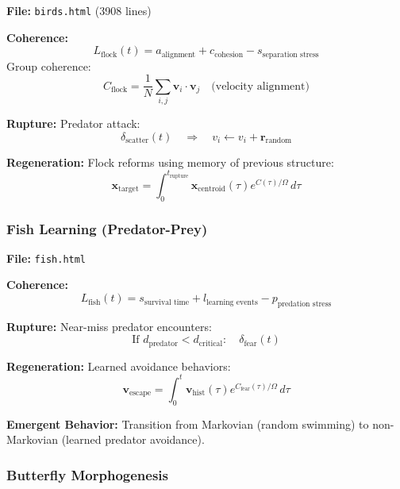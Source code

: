 \documentclass[11pt,a4paper]{article}
\theoremstyle{definition}
\theoremstyle{remark}
\begin{document}
\textbf{File:} \texttt{birds.html} (3908 lines)

\textbf{Coherence:}
\begin{equation}
L_{\text{flock}}(t) = a_{\text{alignment}} + c_{\text{cohesion}} - s_{\text{separation stress}}
\end{equation}
Group coherence:
\begin{equation}
C_{\text{flock}} = \frac{1}{N}\sum_{i,j} \mathbf{v}_i \cdot \mathbf{v}_j \quad \text{(velocity alignment)}
\end{equation}

\textbf{Rupture:} Predator attack:
\begin{equation}
\delta_{\text{scatter}}(t) \quad \Rightarrow \quad v_i \gets v_i + \mathbf{r}_{\text{random}}
\end{equation}

\textbf{Regeneration:} Flock reforms using memory of previous structure:
\begin{equation}
\mathbf{x}_{\text{target}} = \int_0^{t_{\text{rupture}}} \mathbf{x}_{\text{centroid}}(\tau) e^{C(\tau)/\Omega}\,d\tau
\end{equation}

\subsubsection{Fish Learning (Predator-Prey)}

\textbf{File:} \texttt{fish.html}

\textbf{Coherence:}
\begin{equation}
L_{\text{fish}}(t) = s_{\text{survival time}} + l_{\text{learning events}} - p_{\text{predation stress}}
\end{equation}

\textbf{Rupture:} Near-miss predator encounters:
\begin{equation}
\text{If } d_{\text{predator}} < d_{\text{critical}}: \quad \delta_{\text{fear}}(t)
\end{equation}

\textbf{Regeneration:} Learned avoidance behaviors:
\begin{equation}
\mathbf{v}_{\text{escape}} = \int_0^t \mathbf{v}_{\text{hist}}(\tau) e^{C_{\text{fear}}(\tau)/\Omega}\,d\tau
\end{equation}

\textbf{Emergent Behavior:} Transition from Markovian (random swimming) to non-Markovian (learned predator avoidance).

\subsubsection{Butterfly Morphogenesis}
\end{document}

